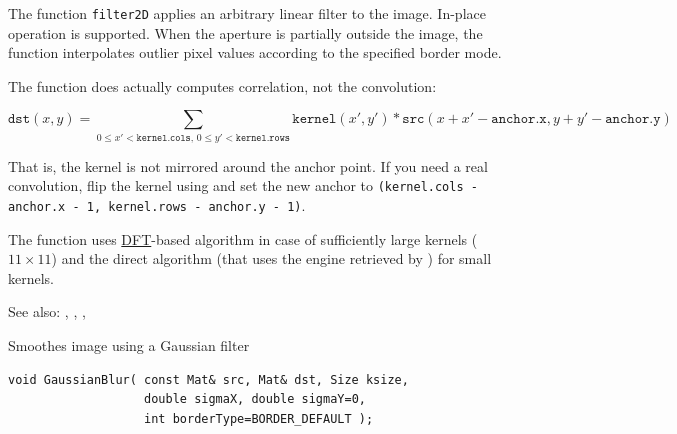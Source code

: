 The function \texttt{filter2D} applies an arbitrary linear filter to the image. In-place operation is supported. When the aperture is partially outside the image, the function interpolates outlier pixel values according to the specified border mode.

The function does actually computes correlation, not the convolution:

\[
\texttt{dst}(x,y) = \sum_{0\leq x' < \texttt{kernel.cols},\,0\leq y' < \texttt{kernel.rows}} \texttt{kernel}(x',y')*\texttt{src}(x+x'-\texttt{anchor.x},y+y'-\texttt{anchor.y})
\]

That is, the kernel is not mirrored around the anchor point. If you need a real convolution, flip the kernel using  and set the new anchor to \texttt{(kernel.cols - anchor.x - 1, kernel.rows - anchor.y - 1)}.

The function uses \href{dft}{DFT}-based algorithm in case of sufficiently large kernels (~$11\times11$) and the direct algorithm (that uses the engine retrieved by ) for small kernels.

See also: , , , 

\label{GaussianBlur}
Smoothes image using a Gaussian filter

\begin{lstlisting}
void GaussianBlur( const Mat& src, Mat& dst, Size ksize,
                   double sigmaX, double sigmaY=0,
                   int borderType=BORDER_DEFAULT );
\end{lstlisting}
\begin{description}
\end{description}

